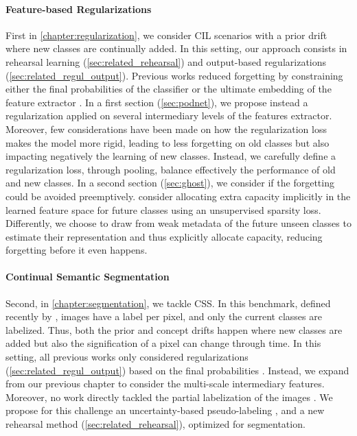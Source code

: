 \paragraph{Feature-based Regularizations} First in \autoref{chapter:regularization}, we consider
\acf{CIL} scenarios with a prior drift where new classes are continually added. In this setting, our
approach consists in rehearsal learning (\autoref{sec:related_rehearsal}) and output-based
regularizations (\autoref{sec:related_regul_output}). Previous works reduced forgetting by
constraining either the final probabilities of the classifier \citep{li2018lwf} or the ultimate
embedding of the feature extractor \citep{hou2019ucir,dhar2019learning_without_memorizing_gradcam}.
In a first section (\autoref{sec:podnet}), we propose instead a regularization applied on several
intermediary levels of the features extractor. Moreover, few considerations have been made on how
the regularization loss makes the model more rigid, leading to less forgetting on old classes but
also impacting negatively the learning of new classes. Instead, we carefully define a regularization
loss, through pooling, balance effectively the performance of old and new classes. In a second
section (\autoref{sec:ghost}), we consider if the forgetting could be avoided preemptively.
\citet{aljundi2019selfless} consider allocating extra capacity implicitly in the learned feature
space for future classes using an unsupervised sparsity loss. Differently, we choose to draw from
weak metadata of the future unseen classes \citep{hanrebuffi2020autodiscovering} to estimate their
representation and thus explicitly allocate capacity, reducing forgetting before it even happens.

\paragraph{Continual Semantic Segmentation} Second, in \autoref{chapter:segmentation}, we tackle
\acf{CSS}. In this benchmark, defined recently by \citet{cermelli2020modelingthebackground}, images
have a label per pixel, and only the current classes are labelized. Thus, both the prior and concept
drifts happen where new classes are added but also the signification of a pixel can change through
time. In this setting, all previous works only considered regularizations
(\autoref{sec:related_regul_output}) based on the final probabilities
\citep{michieli2019ilt,cermelli2020modelingthebackground}. Instead, we expand from our previous
chapter to consider the multi-scale intermediary features. Moreover, no work directly tackled the
partial labelization of the images \citep{cermelli2020modelingthebackground}. We propose for this
challenge an uncertainty-based pseudo-labeling \citep{saporta2020esl}, and a new rehearsal method
(\autoref{sec:related_rehearsal}), optimized for segmentation.

